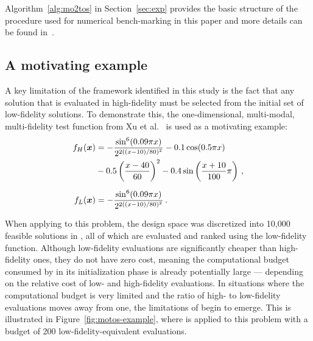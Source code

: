 Algorithm~\ref{alg:mo2tos} in Section~\ref{sec:exp} provides the basic structure of the \motos{} procedure used for numerical bench-marking in this paper and more details can be found in~\cite{xu2016mo2tos}.

\subsection{A motivating example}

A key limitation of the \motos{} framework identified in this study is the fact that any solution that is evaluated in high-fidelity must be selected from the initial set of low-fidelity solutions. To demonstrate this, the one-dimensional, multi-modal, multi-fidelity test function from Xu et al.~\cite{xu2016mo2tos} is used as a motivating example:%
\begin{align}
f_H(\boldsymbol{x}) &= -\frac{\sin^6(0.09\pi x)}{2^{2((x-10)/80)^2}}-0.1\cos(0.5\pi x)\nonumber\\
           &-0.5\left(\frac{x-40}{60}\right)^2- 0.4\sin\left(\frac{x+10}{100}\pi\right)\,,\label{eq:hf-ex}\\[0.2cm]
f_L(\boldsymbol{x}) &= -\frac{\sin^6(0.09\pi x)}{2^{2((x-10)/80)^2}}\,. \label{eq:lf-ex}
\end{align}

When applying \motos{} to this problem, the design space was discretized into 10,000 feasible solutions in \cite{xu2016mo2tos}, all of which are evaluated and ranked using the low-fidelity function. Although low-fidelity evaluations are significantly cheaper than high-fidelity ones, they do not have zero cost, meaning the computational budget consumed by \motos{} in its initialization phase is already potentially large --- depending on the relative cost of low- and high-fidelity evaluations. In situations where the computational budget is very limited and the ratio of high- to low-fidelity evaluations moves away from one, the limitations of \motos{} begin to emerge. This is illustrated in Figure~\ref{fig:motos-example}, where \motos{} is applied to this problem with a budget of 200 low-fidelity-equivalent evaluations.


